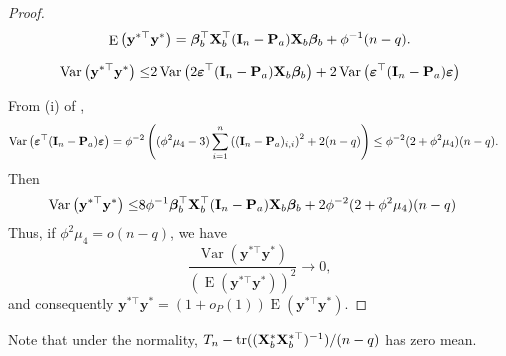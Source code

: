 \documentclass[11pt]{article}
\DeclareMathOperator{\mytr}{tr}
\DeclareMathOperator{\myE}{E}
\DeclareMathOperator{\myVar}{Var}
\newcommand{\By}{\mathbf{y}}    \newcommand{\Bz}{\mathbf{z}}
\newcommand{\bfsym}[1]{\ensuremath{\boldsymbol{#1}}}
\def\bbeta{\bfsym \beta}
\theoremstyle{plain}
\theoremstyle{definition}
\theoremstyle{remark}
\begin{document}
\begin{appendices}
\begin{proof}
\begin{equation*}
    \myE \left(\By^{*\top} \By^*\right) = \bbeta_b^\top \BX_b^\top (\BI_n-\BP_a) \BX_b \bbeta_b
    + \phi^{-1}(n-q).
\end{equation*}


\begin{equation*}
    \begin{split}
    \myVar \left( \By^{*\top} \By^* \right) 
    \leq  &
    2\myVar \left( 2 \bepsilon^\top (\BI_n -\BP_a) \BX_b \bbeta_b \right) + 2\myVar \left( \bepsilon^\top (\BI_n - \BP_a) \bepsilon \right)
    \\
    \end{split}
\end{equation*}

From (i) of \cite[Proposition A.1]{chen2010tests},
\begin{equation*}
    \begin{split}
\myVar\left( \bepsilon^\top (\BI_n - \BP_a) \bepsilon \right)
&=
\phi^{-2}\left(
    (\phi^2 \mu_4 - 3) \sum_{i=1}^n \left((\BI_n -\BP_a)_{i,i}\right)^2
    + 2(n-q)
\right)
    \leq
    \phi^{-2}(2+\phi^2 \mu_4)(n-q)
    .
    \end{split}
\end{equation*}
Then
\begin{equation*}
    \begin{split}
    \myVar \left( \By^{*\top} \By^* \right) 
    \leq  &
    8 \phi^{-1} \bbeta_b^\top \BX_b^\top (\BI_n -\BP_a) \BX_b \bbeta_b 
    +
    2 \phi^{-2} (2+\phi^2 \mu_4) (n-q)
    \end{split}
\end{equation*}
Thus, if $\phi^2\mu_4=o(n-q)$, we have
\begin{equation*}
    \frac{
        \myVar \left( \By^{*\top} \By^* \right) 
    }{
        \left(\myE \left( \By^{*\top} \By^* \right) \right)^2
    }
    \to 0,
\end{equation*}
and consequently $\By^{*\top} \By^*=(1+o_P(1))\myE (\By^{*\top} \By^*)$.

\end{proof}


Note that under the normality, $T_n- \mytr ((\BX_b^* \BX_b^{*\top})^{-1})/(n-q)$ has zero mean.





\end{appendices}
\end{document}
